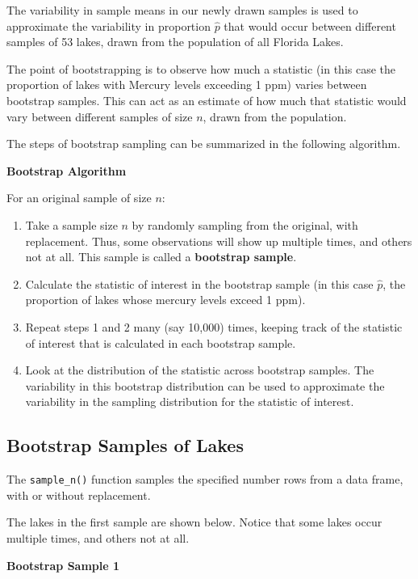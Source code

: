 \documentclass[
  letterpaper,
  DIV=11,
  numbers=noendperiod]{scrreprt}
\begin{document}
The variability in sample means in our newly drawn samples is used to
approximate the variability in proportion \(\hat{p}\) that would occur
between different samples of 53 lakes, drawn from the population of all
Florida Lakes.

The point of bootstrapping is to observe how much a statistic (in this
case the proportion of lakes with Mercury levels exceeding 1 ppm) varies
between bootstrap samples. This can act as an estimate of how much that
statistic would vary between different samples of size \(n\), drawn from
the population.

The steps of bootstrap sampling can be summarized in the following
algorithm.

\textbf{Bootstrap Algorithm}

For an original sample of size \(n\):

\begin{enumerate}
\def\labelenumi{\arabic{enumi}.}
\item
  Take a sample size \(n\) by randomly sampling from the original, with
  replacement. Thus, some observations will show up multiple times, and
  others not at all. This sample is called a \textbf{bootstrap sample}.
\item
  Calculate the statistic of interest in the bootstrap sample (in this
  case \(\hat{p}\), the proportion of lakes whose mercury levels exceed
  1 ppm).
\item
  Repeat steps 1 and 2 many (say 10,000) times, keeping track of the
  statistic of interest that is calculated in each bootstrap sample.
\item
  Look at the distribution of the statistic across bootstrap samples.
  The variability in this bootstrap distribution can be used to
  approximate the variability in the sampling distribution for the
  statistic of interest.
\end{enumerate}

\subsection{Bootstrap Samples of
Lakes}\label{bootstrap-samples-of-lakes}

The \texttt{sample\_n()} function samples the specified number rows from
a data frame, with or without replacement.

The lakes in the first sample are shown below. Notice that some lakes
occur multiple times, and others not at all.

\textbf{Bootstrap Sample 1}
\end{document}
